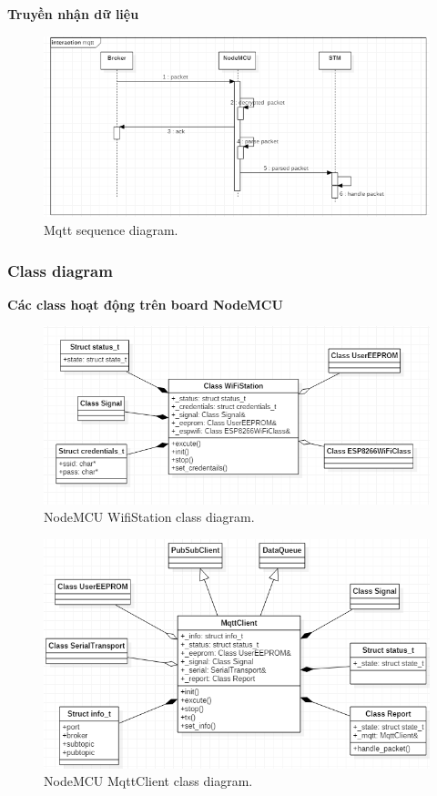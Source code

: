 \documentclass[a4paper,12pt,oneside]{article}
\begin{document}
\noindent \textbf{Truyền nhận dữ liệu}
\begin{figure}[H]
\centering
\begin{center}
\includegraphics[scale=.8]{hinh/sq_mqtt.PNG}
\end{center}
\caption{Mqtt sequence diagram.}
\end{figure}

\subsubsection{Class diagram}
\noindent \textbf{Các class hoạt động trên board NodeMCU}\\
\begin{figure}[H]
\centering
\begin{center}
\includegraphics[scale=.8]{hinh/class_wifistation.PNG}
\end{center}
\caption{NodeMCU WifiStation class diagram.}
\end{figure}

\begin{figure}[H]
\centering
\begin{center}
\includegraphics[scale=.8]{hinh/class_mqttclient.PNG}
\end{center}
\caption{NodeMCU MqttClient class diagram.}
\end{figure}
\end{document}
